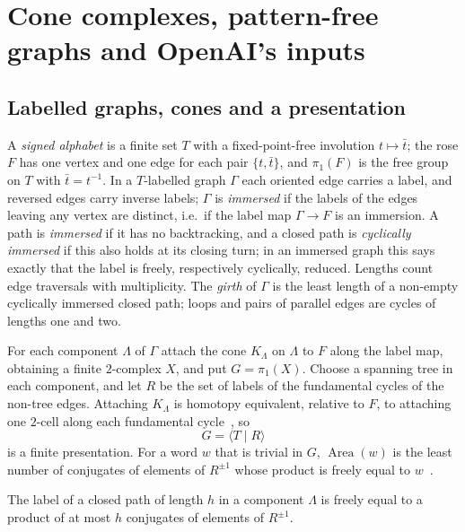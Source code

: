 \documentclass[11pt]{article}
\theoremstyle{definition}
\theoremstyle{plain}
\newcommand{\Area}{\operatorname{Area}}
\begin{document}
\section{Cone complexes, pattern-free graphs and OpenAI's inputs}\label{sec:setup}

\subsection{Labelled graphs, cones and a presentation}
A \emph{signed alphabet} is a finite set $T$ with a fixed-point-free involution $t\mapsto\bar t$; the rose $F$ has one vertex and one edge for each pair $\{t,\bar t\}$, and $\pi_1(F)$ is the free group on $T$ with $\bar t=t^{-1}$. In a $T$-labelled graph $\Gamma$ each oriented edge carries a label, and reversed edges carry inverse labels; $\Gamma$ is \emph{immersed} if the labels of the edges leaving any vertex are distinct, i.e.\ if the label map $\Gamma\to F$ is an immersion. A path is \emph{immersed} if it has no backtracking, and a closed path is \emph{cyclically immersed} if this also holds at its closing turn; in an immersed graph this says exactly that the label is freely, respectively cyclically, reduced. Lengths count edge traversals with multiplicity. The \emph{girth} of $\Gamma$ is the least length of a non-empty cyclically immersed closed path; loops and pairs of parallel edges are cycles of lengths one and two.

For each component $\Lambda$ of $\Gamma$ attach the cone $K_\Lambda$ on $\Lambda$ to $F$ along the label map, obtaining a finite $2$-complex $X$, and put $G=\pi_1(X)$. Choose a spanning tree in each component, and let $R$ be the set of labels of the fundamental cycles of the non-tree edges. Attaching $K_\Lambda$ is homotopy equivalent, relative to $F$, to attaching one $2$-cell along each fundamental cycle~\cite[proof of Lemma~5.2]{OAI196}, so
\begin{equation}\label{eq:presentation}
G=\langle T\mid R\rangle
\end{equation}
is a finite presentation. For a word $w$ that is trivial in $G$, $\Area(w)$ is the least number of conjugates of elements of $R^{\pm1}$ whose product is freely equal to $w$~\cite[Ch.~V]{LyndonSchupp1977}.

\begin{lemma}\label{lem:conearea}
The label of a closed path of length $h$ in a component $\Lambda$ is freely equal to a product of at most $h$ conjugates of elements of $R^{\pm1}$.
\end{lemma}
\end{document}
